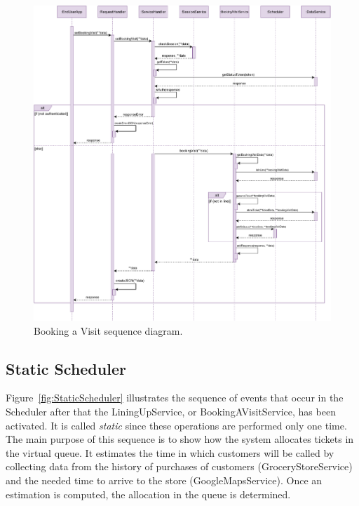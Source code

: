 \begin{figure}[H]
	\centering
	\includegraphics[width=1.0\textwidth]{images/bookingVisit_sequence_diagram.pdf}
	\caption{Booking a Visit sequence diagram.}\label{fig:BookingVisit}
\end{figure}

\subsection{Static Scheduler}

Figure~\ref{fig:StaticScheduler} illustrates the sequence of events that occur in the Scheduler after that the LiningUpService, or BookingAVisitService, has been activated.
It is called \textit{static} since these operations are performed only one time.
The main purpose of this sequence is to show how the system allocates tickets in the virtual queue. It estimates the time in which customers will be called by collecting data from the history of purchases of customers (GroceryStoreService) and the needed time to arrive to the store (GoogleMapsService). Once an estimation is computed, the allocation in the queue is determined.

